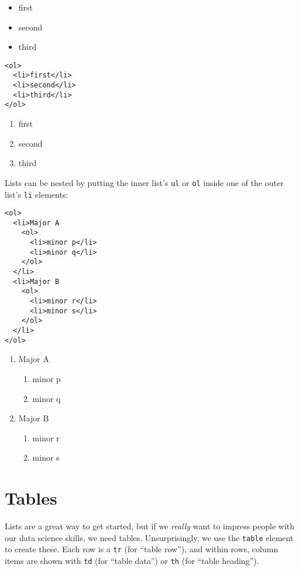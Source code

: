 \begin{itemize}
\item
  first
\item
  second
\item
  third
\end{itemize}

\begin{verbatim}
<ol>
  <li>first</li>
  <li>second</li>
  <li>third</li>
</ol>
\end{verbatim}

\begin{enumerate}
\item
  first
\item
  second
\item
  third
\end{enumerate}

Lists can be nested by putting the inner list's \texttt{ul} or \texttt{ol}
inside one of the outer list's \texttt{li} elements:

\begin{verbatim}
<ol>
  <li>Major A
    <ol>
      <li>minor p</li>
      <li>minor q</li>
    </ol>
  </li>
  <li>Major B
    <ol>
      <li>minor r</li>
      <li>minor s</li>
    </ol>
  </li>
</ol>
\end{verbatim}

\begin{enumerate}
\item
  Major A

  \begin{enumerate}
    \item
    minor p
  \item
    minor q
  \end{enumerate}
\item
  Major B

  \begin{enumerate}
    \item
    minor r
  \item
    minor s
  \end{enumerate}
\end{enumerate}

\section{Tables}\label{s:htmlcss-tables}

Lists are a great way to get started,
but if we \emph{really} want to impress people with our data science skills,
we need tables.
Unsurprisingly,
we use the \texttt{table} element to create these.
Each row is a \texttt{tr} (for ``table row''),
and within rows,
column items are shown with \texttt{td} (for ``table data'')
or \texttt{th} (for ``table heading'').

